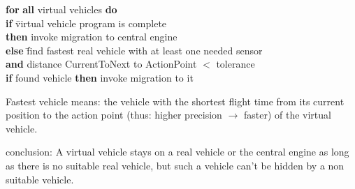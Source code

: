 	\begin{tabbing}
	\textbf{for} \= \textbf{all} virtual vehicles \textbf{do} \\[.25cm]
	\> \textbf{if}  \= virtual vehicle program is complete \\
	\> \>	\textbf{then} invoke migration to central engine \\[.25cm]
	\>	\textbf{else} \= find fastest real vehicle with at least one needed sensor \\
	\> \>	\textbf{and} distance CurrentToNext to ActionPoint \begin{math}< \end{math} tolerance \\[.25cm]
	\>	\textbf{if} found vehicle \textbf{then} invoke migration to it \\
	\end{tabbing}

Fastest vehicle means: the vehicle with the shortest flight time from its current position to the action point (thus: higher precision \begin{math} \rightarrow \end{math} faster)
of the virtual vehicle. 

conclusion:
A virtual vehicle stays on a real vehicle or the central engine as long as there is no suitable real vehicle, but such a vehicle can't 
be hidden by a non suitable vehicle.
